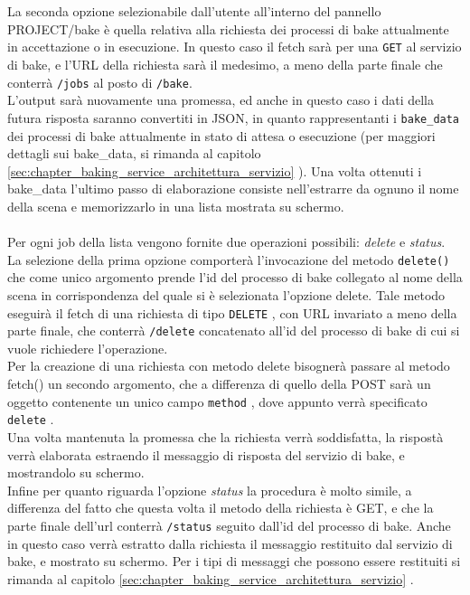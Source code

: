 \\
\\
La seconda opzione selezionabile dall’utente all’interno del pannello PROJECT/bake è quella relativa alla richiesta dei processi di bake attualmente in accettazione o in esecuzione.
In questo caso il fetch sarà per una \texttt{GET} al servizio di bake, e l’URL della richiesta sarà il medesimo, a meno della parte finale che conterrà \texttt{/jobs} al posto di \texttt{/bake}.
\\
L’output sarà nuovamente una promessa, ed anche in questo caso i dati della futura risposta saranno convertiti in JSON, in quanto rappresentanti i \texttt{bake\_data} dei processi di bake attualmente in stato di attesa o esecuzione (per maggiori dettagli sui bake\_data, si rimanda al capitolo \ref{sec:chapter_baking_service_architettura_servizio} ).
Una volta ottenuti i bake\_data l’ultimo passo di elaborazione consiste nell’estrarre da ognuno il nome della scena e memorizzarlo in una lista mostrata su schermo.
\\
\\
Per ogni job della lista vengono fornite due operazioni possibili: \emph{delete} e \emph{status}. 
\\
La selezione della prima opzione comporterà l’invocazione del metodo \texttt{delete()} che come unico argomento prende l’id del processo di bake collegato al nome della scena in corrispondenza del quale si è selezionata l’opzione delete. Tale metodo eseguirà il fetch di una richiesta di tipo \texttt{DELETE} , con URL invariato a meno della parte finale, che conterrà \texttt{/delete} concatenato all’id del processo di bake di cui si vuole richiedere l’operazione.
\\
Per la creazione di una richiesta con metodo delete bisognerà passare al metodo fetch() un secondo argomento, che a differenza di quello della POST sarà un oggetto contenente un unico campo \texttt{method} , dove appunto verrà specificato \texttt{delete} .
\\ 
Una volta mantenuta la promessa che la richiesta verrà soddisfatta, la rispostà verrà elaborata estraendo il messaggio di risposta del servizio di bake, e mostrandolo su schermo.
\\
Infine per quanto riguarda l’opzione \emph{status} la procedura è molto simile, a differenza del fatto che questa volta il metodo della richiesta è GET, e che la parte finale dell’url conterrà \texttt{/status} seguito dall’id del processo di bake. Anche in questo caso verrà estratto dalla richiesta il messaggio restituito dal servizio di bake, e mostrato su schermo. Per i tipi di messaggi che possono essere restituiti si rimanda al capitolo \ref{sec:chapter_baking_service_architettura_servizio} .

